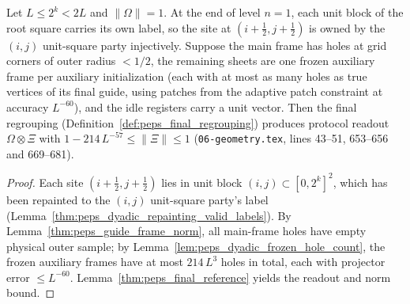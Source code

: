 \begin{lemma}
    \label{thm:peps_dyadic_protocol_final_step}
    \leanok
    Let $L\le 2^k<2L$ and $\lVert\Omega\rVert=1$. At the end of level $n=1$, each unit block of the root square carries its own label, so the site at $(i+\frac12,j+\frac12)$ is owned by the $(i,j)$ unit-square party injectively. Suppose the main frame has holes at grid corners of outer radius $<1/2$, the remaining sheets are one frozen auxiliary frame per auxiliary initialization (each with at most as many holes as true vertices of its final guide, using patches from the adaptive patch constraint at accuracy $L^{-60}$), and the idle registers carry a unit vector. Then the final regrouping (Definition~\ref{def:peps_final_regrouping}) produces protocol readout $\Omega\otimes\Xi$ with $1-214\,L^{-57}\le\lVert\Xi\rVert\le1$ (\texttt{06-geometry.tex}, lines 43--51, 653--656 and 669--681).
\end{lemma}

\begin{proof}\leanok
    Each site $(i+\frac12,j+\frac12)$ lies in unit block $(i,j)\subset[0,2^k]^2$, which has been repainted to the $(i,j)$ unit-square party's label (Lemma~\ref{thm:peps_dyadic_repainting_valid_labels}). By Lemma~\ref{thm:peps_guide_frame_norm}, all main-frame holes have empty physical outer sample; by Lemma~\ref{lem:peps_dyadic_frozen_hole_count}, the frozen auxiliary frames have at most $214\,L^3$ holes in total, each with projector error $\le L^{-60}$. Lemma~\ref{thm:peps_final_reference} yields the readout and norm bound.
\end{proof}

